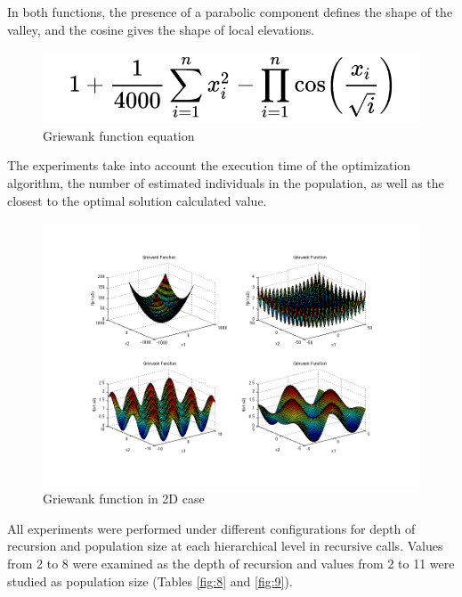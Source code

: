 \documentclass[graybox]{styles/svmult}
\begin{document}
In both functions, the presence of a parabolic component defines the shape of the valley, and the cosine gives the shape of local elevations.

\begin{figure}[b]
\sidecaption
\includegraphics[width=1.0\textwidth]{images/fig02a}
\caption{Griewank function equation}
\label{fig:6}
\end{figure}

The experiments take into account the execution time of the optimization algorithm, the number of estimated individuals in the population, as well as the closest to the optimal solution calculated value.

\begin{figure}[b]
\sidecaption
\includegraphics[width=1.0\textwidth]{images/fig02b}
\caption{Griewank function in 2D case}
\label{fig:7}
\end{figure}

All experiments were performed under different configurations for depth of recursion and population size at each hierarchical level in recursive calls. Values from 2 to 8 were examined as the depth of recursion and values from 2 to 11 were studied as population size (Tables \ref{fig:8} and \ref{fig:9}).
\end{document}
